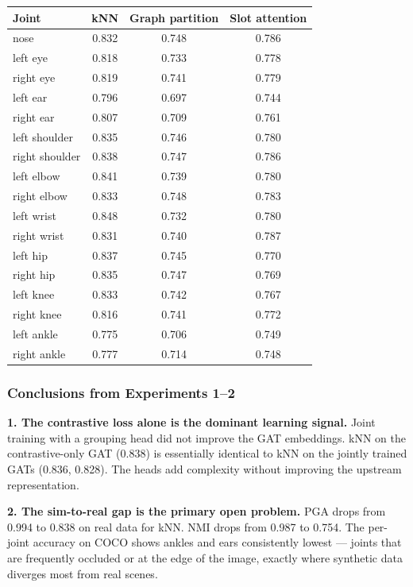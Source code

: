 \begin{center}
\small
\begin{tabular}{lccc}
\toprule
Joint & kNN & Graph partition & Slot attention \\
\midrule
nose & 0.832 & 0.748 & 0.786 \\
left eye & 0.818 & 0.733 & 0.778 \\
right eye & 0.819 & 0.741 & 0.779 \\
left ear & 0.796 & 0.697 & 0.744 \\
right ear & 0.807 & 0.709 & 0.761 \\
left shoulder & 0.835 & 0.746 & 0.780 \\
right shoulder & 0.838 & 0.747 & 0.786 \\
left elbow & 0.841 & 0.739 & 0.780 \\
right elbow & 0.833 & 0.748 & 0.783 \\
left wrist & 0.848 & 0.732 & 0.780 \\
right wrist & 0.831 & 0.740 & 0.787 \\
left hip & 0.837 & 0.745 & 0.770 \\
right hip & 0.835 & 0.747 & 0.769 \\
left knee & 0.833 & 0.742 & 0.767 \\
right knee & 0.816 & 0.741 & 0.772 \\
left ankle & 0.775 & 0.706 & 0.749 \\
right ankle & 0.777 & 0.714 & 0.748 \\
\bottomrule
\end{tabular}
\end{center}


\subsubsection{Conclusions from Experiments 1--2}

\textbf{1. The contrastive loss alone is the dominant learning signal.} Joint training with a grouping head did not improve the GAT embeddings. kNN on the contrastive-only GAT (0.838) is essentially identical to kNN on the jointly trained GATs (0.836, 0.828). The heads add complexity without improving the upstream representation.

\textbf{2. The sim-to-real gap is the primary open problem.} PGA drops from 0.994 to 0.838 on real data for kNN. NMI drops from 0.987 to 0.754. The per-joint accuracy on COCO shows ankles and ears consistently lowest --- joints that are frequently occluded or at the edge of the image, exactly where synthetic data diverges most from real scenes.

